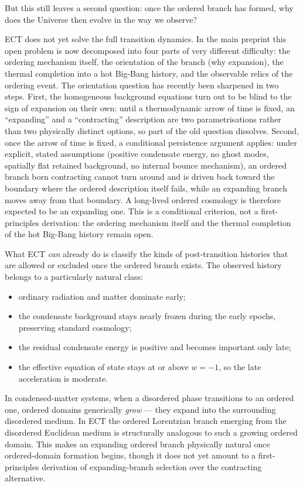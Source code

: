 \documentclass[11pt,a4paper]{article}
\begin{document}
But this still leaves a second question: once the ordered branch
has formed, why does the Universe then evolve in the way we observe?

ECT does not yet solve the full transition dynamics.
In the main preprint this open problem is now decomposed into four
parts of very different difficulty: the ordering mechanism itself,
the orientation of the branch (why expansion), the thermal completion
into a hot Big-Bang history, and the observable relics of the
ordering event.
The orientation question has recently been sharpened in two steps.
First, the homogeneous background equations turn out to be blind to
the sign of expansion on their own: until a thermodynamic arrow of
time is fixed, an ``expanding'' and a ``contracting'' description are
two parametrisations rather than two physically distinct options, so
part of the old question dissolves.
Second, once the arrow of time is fixed, a conditional persistence
argument applies: under explicit, stated assumptions (positive
condensate energy, no ghost modes, spatially flat retained
background, no internal bounce mechanism), an ordered branch born
contracting cannot turn around and is driven back toward the boundary
where the ordered description itself fails, while an expanding branch
moves away from that boundary.
A long-lived ordered cosmology is therefore expected to be an
expanding one.
This is a conditional criterion, not a first-principles derivation:
the ordering mechanism itself and the thermal completion of the hot
Big-Bang history remain open.

What ECT \emph{can} already do is classify the kinds of
post-transition histories that are allowed or excluded once the
ordered branch exists.  The observed history belongs to a
particularly natural class:
\begin{itemize}[nosep]
  \item ordinary radiation and matter dominate early;
  \item the condensate background stays nearly frozen during the
    early epochs, preserving standard cosmology;
  \item the residual condensate energy is positive and becomes
    important only late;
  \item the effective equation of state stays at or above
    $w=-1$, so the late acceleration is moderate.
\end{itemize}

In condensed-matter systems, when a disordered phase transitions
to an ordered one, ordered domains generically \emph{grow} ---
they expand into the surrounding disordered medium.  In ECT the
ordered Lorentzian branch emerging from the disordered Euclidean
medium is structurally analogous to such a growing ordered domain.
This makes an expanding ordered branch physically natural once
ordered-domain formation begins, though it does not yet amount to
a first-principles derivation of expanding-branch selection over
the contracting alternative.
\end{document}

